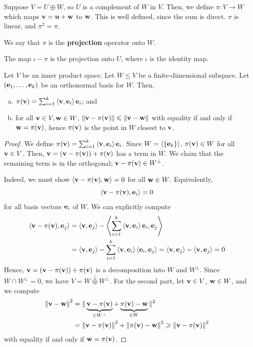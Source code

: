 \documentclass[a4paper]{article}
\begin{document}
\begin{definition}
	Suppose \( V = U \oplus W \), so \( U \) is a complement of \( W \) in \( V \).
	Then, we define \( \pi \colon V \to W \) which maps \( {\bf v} = {\bf u} + {\bf w} \) to \( {\bf w} \).
	This is well defined, since the sum is direct.
	\( \pi \) is linear, and \( \pi^2 = \pi \).

	We say that \( \pi \) is the \textbf{projection} operator onto \( W \).
\end{definition}
\begin{remark}
	The map \( \iota - \pi \) is the projection onto \( U \), where \( \iota \) is the identity map.
\end{remark}
\begin{lemma}
	Let \( V \) be an inner product space.
	Let \( W \leq V \) be a finite-dimensional subspace.
	Let \( ({\bf e}_1, \dots, {\bf e}_k) \) be an orthonormal basis for \( W \).
	Then,
	\begin{enumerate}[(a)]
		\item \( \pi({\bf v}) = \sum_{i=1}^k \left\langle{{\bf v}, {\bf e}_i}\right\rangle {\bf e}_i \); and
		\item for all \( {\bf v} \in V, {\bf w} \in W \), \( \norm{{\bf v} - \pi({\bf v})} \leqslant \norm{{\bf v} - {\bf w}} \) with equality if and only if \( {\bf w} = \pi({\bf v}) \), hence \( \pi({\bf v}) \) is the point in \( W \) closest to \( {\bf v} \).
	\end{enumerate}
\end{lemma}
\begin{proof}
	We define \( \pi({\bf v}) = \sum_{i=1}^k \left\langle{{\bf v}, {\bf e}_i}\right\rangle {\bf e}_i \).
	Since \( W = \left\langle{} \qty{{\bf e}_k} \right\rangle \), \( \pi({\bf v}) \in W \) for all \( {\bf v} \in V \).
	Then, \( {\bf v} = ({\bf v} - \pi({\bf v})) + \pi({\bf v}) \) has a term in \( W \).
	We claim that the remaining term is in the orthogonal; \( {\bf v} - \pi({\bf v}) \in W^\perp \).

	Indeed, we must show \( \left\langle{{\bf v}- \pi({\bf v}), {\bf w}}\right\rangle = 0 \) for all \( {\bf w} \in W \).
	Equivalently, 
	\[
		\left\langle{{\bf v}- \pi({\bf v}), {\bf e}_i}\right\rangle = 0
	\]
	for all basis vectors \( {\bf e}_i \) of \( W \).
	We can explicitly compute
	\begin{align*}
		\left\langle{{\bf v}- \pi({\bf v}), {\bf e}_j}\right\rangle &= \left\langle{{\bf v}, {\bf e}_j}\right\rangle - \left\langle{\sum_{i=1}^k \left\langle{{\bf v}, {\bf e}_i}\right\rangle {\bf e}_i, {\bf e}_j}\right\rangle \\ 
		&= \left\langle{{\bf v}, {\bf e}_j}\right\rangle - \sum_{i=1}^k \left\langle{{\bf v}, {\bf e}_i}\right\rangle \left\langle{{\bf e}_i, {\bf e}_j}\right\rangle = \left\langle{{\bf v}, {\bf e}_j}\right\rangle - \left\langle{{\bf v}, {\bf e}_j}\right\rangle = 0
	\end{align*}
	Hence, \( {\bf v} = ({\bf v} - \pi({\bf v})) + \pi({\bf v}) \) is a decomposition into \( W \) and \( W^\perp \).
	Since \( W \cap W^\perp = \qty{0} \), we have \( V = W \overset{\perp}{\oplus} W^\perp \).
	For the second part, let \( {\bf v} \in V \), \( {\bf w} \in W \), and we compute
	\begin{align*}
		\norm{{\bf v} - {\bf w}}^2 &= \|\underbrace{{\bf v} - \pi({\bf v})}_{\in W^\perp} + \underbrace{\pi({\bf v}) - {\bf w}}_{\in W}\|^2 \\ 
		&= \norm{{\bf v} - \pi({\bf v})}^2 + \norm{\pi({\bf v}) - {\bf w}}^2 \geqslant \norm{{\bf v} - \pi({\bf v})}^2
	\end{align*}
	with equality if and only if \( {\bf w} = \pi({\bf v}) \).
\end{proof}
\end{document}
